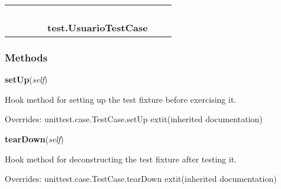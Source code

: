    \label{test:UsuarioTestCase}
\begin{tabular}{cccccccc}
\multicolumn{2}{r}{\settowidth{\BCL}{object}\multirow{2}{\BCL}{object}}
&&
&&
  \\\cline{3-3}
  &&\multicolumn{1}{c|}{}
&&
&&
  \\
\multicolumn{4}{r}{\settowidth{\BCL}{unittest.case.TestCase}\multirow{2}{\BCL}{unittest.case.TestCase}}
&&
  \\\cline{5-5}
  &&&&\multicolumn{1}{c|}{}
&&
  \\
&&&&\multicolumn{2}{l}{\textbf{test.UsuarioTestCase}}
\end{tabular}



  \subsubsection{Methods}

    \vspace{0.5ex}

\hspace{.8\funcindent}\begin{boxedminipage}{\funcwidth}

    \raggedright \textbf{setUp}(\textit{self})

\setlength{\parskip}{2ex}
    Hook method for setting up the test fixture before exercising it.

\setlength{\parskip}{1ex}
      Overrides: unittest.case.TestCase.setUp 	extit{(inherited documentation)}

    \end{boxedminipage}

    \vspace{0.5ex}

\hspace{.8\funcindent}\begin{boxedminipage}{\funcwidth}

    \raggedright \textbf{tearDown}(\textit{self})

\setlength{\parskip}{2ex}
    Hook method for deconstructing the test fixture after testing it.

\setlength{\parskip}{1ex}
      Overrides: unittest.case.TestCase.tearDown 	extit{(inherited documentation)}

    \end{boxedminipage}

